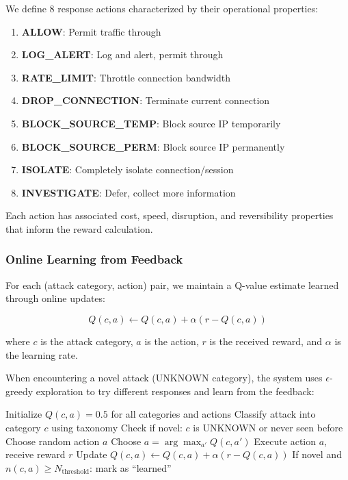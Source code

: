 \documentclass[conference]{IEEEtran}
\begin{document}
We define 8 response actions characterized by their operational properties:

\begin{enumerate}
    \item \textbf{ALLOW}: Permit traffic through
    \item \textbf{LOG\_ALERT}: Log and alert, permit through
    \item \textbf{RATE\_LIMIT}: Throttle connection bandwidth
    \item \textbf{DROP\_CONNECTION}: Terminate current connection
    \item \textbf{BLOCK\_SOURCE\_TEMP}: Block source IP temporarily
    \item \textbf{BLOCK\_SOURCE\_PERM}: Block source IP permanently
    \item \textbf{ISOLATE}: Completely isolate connection/session
    \item \textbf{INVESTIGATE}: Defer, collect more information
\end{enumerate}

Each action has associated cost, speed, disruption, and reversibility properties that inform the reward calculation.

\subsubsection{Online Learning from Feedback}

For each (attack category, action) pair, we maintain a Q-value estimate learned through online updates:

\begin{equation}
Q(c, a) \leftarrow Q(c, a) + \alpha (r - Q(c, a))
\end{equation}

where $c$ is the attack category, $a$ is the action, $r$ is the received reward, and $\alpha$ is the learning rate.

When encountering a novel attack (UNKNOWN category), the system uses $\epsilon$-greedy exploration to try different responses and learn from the feedback:

\begin{algorithm}[htbp]
\caption{Scalable Decision-Making with Online Learning}
\begin{algorithmic}[1]
\State Initialize $Q(c, a) = 0.5$ for all categories and actions
    \State Classify attack into category $c$ using taxonomy
    \State Check if novel: $c$ is UNKNOWN or never seen before
        \State Choose random action $a$ 
    \Else
        \State Choose $a = \arg\max_{a'} Q(c, a')$ 
    \EndIf
    \State Execute action $a$, receive reward $r$
    \State Update $Q(c, a) \leftarrow Q(c, a) + \alpha (r - Q(c, a))$
    \State If novel and $n(c, a) \geq N_{\text{threshold}}$: mark as ``learned''
\EndFor
\end{algorithmic}
\end{algorithm}
\end{document}
